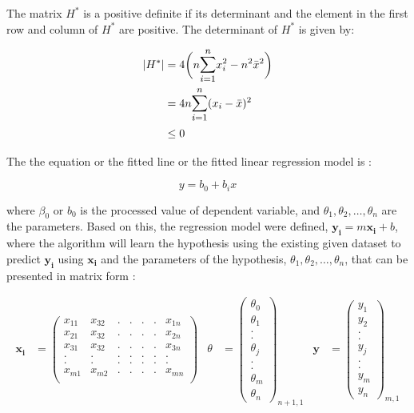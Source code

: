 \documentclass[12pt]{article}
\begin{document}
The matrix $H^\ast$ is a positive definite if its determinant and the element in the first row and column of $H^\ast$ are positive. The determinant of $H^\ast$ is given by:

\begin{align}
	|H^\ast| &= 4 \bigg ( n  \mathlarger{\sum^{n}_{i=1}} x_i^2 - n^2 \bar{x} ^2 \bigg ) \\
	&= 4n \mathlarger{\sum^{n}_{i=1}} (x_i - \bar{x})^2 \\ 
	&\leq 0
\end{align}

The the equation or the fitted line or the fitted linear regression model is :

\begin{equation}
	y = b_0 + b_i x
\end{equation}

where $\beta_0$ or $b_0$ is the processed value of dependent variable, and $\theta_1, \theta_2, \dots, \theta_n$ are the parameters. Based on this, the regression model were defined, $\mathbf{y_i} = m\mathbf{x_i} + b$, where the algorithm will learn the hypothesis using the existing given dataset to predict $\mathbf{y_i}$ using $\mathbf{x_i}$ and the parameters of the hypothesis, $\theta_1, \theta_2, \dots, \theta_n$, that can be presented in matrix form :

\singlespacing
\begin{align}
	\mathbf{x_i} &= \begin{pmatrix}
		x_{11} & x_{32} & . & . & . & . & x_{1n} \\
		x_{21} & x_{32} & . & . & . & . & x_{2n} \\
		x_{31} & x_{32} & . & . & . & . & x_{3n} \\
		. & . & . & . & . & . & . \\
		. & . & . & . & . & . & . \\
		x_{m1} & x_{m2} & . & . & . & . & x_{mn} \\
	\end{pmatrix} & \theta &= \begin{pmatrix}
		\theta_0 \\
		\theta_1 \\
		. \\
		. \\
		\theta_j \\
		. \\ 
		. \\
		\theta_{m} \\ 
		\theta_{n}
	\end{pmatrix}_{n+1,1} & \mathbf{y} &= \begin{pmatrix}
		y_1 \\
		y_2 \\
		. \\
		. \\
		y_j \\
		. \\ 
		. \\
		y_{m}  \\ 
		y_{n}
	\end{pmatrix}_{m,1}  
\end{align}
\end{document}
